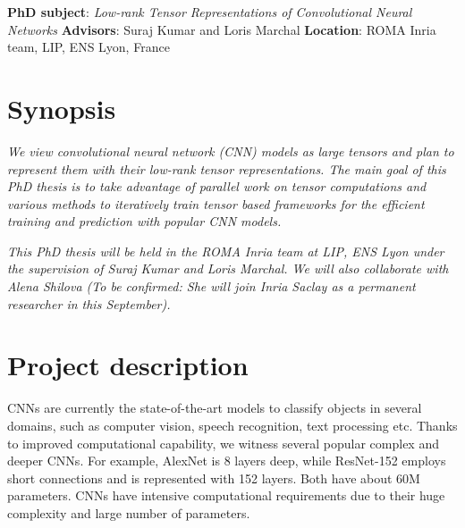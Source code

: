 \documentclass[11pt]{article}
\date{}
\begin{document}

 \noindent\textbf{PhD subject}: \emph{Low-rank Tensor Representations of Convolutional Neural Networks }\newline
 \textbf{Advisors}: Suraj Kumar and Loris Marchal\newline
 \textbf{Location}: ROMA Inria team, LIP, ENS Lyon, France

\section*{Synopsis}

\emph{We view convolutional neural network (CNN) models as large tensors and plan to represent them with their low-rank tensor representations. The main goal of this PhD thesis is to take advantage of parallel work on tensor computations and various methods to iteratively train tensor based frameworks for the efficient training and prediction with popular CNN models.}


\emph{This PhD thesis will be held in the ROMA Inria team at LIP, ENS Lyon under the supervision of Suraj Kumar and Loris Marchal. We will also collaborate with  Alena Shilova (To be confirmed: She will  join Inria Saclay as a permanent researcher in this September). }



\section{Project description}

CNNs are currently the state-of-the-art models to classify objects in several domains, such as computer vision, speech recognition, text processing etc. Thanks to improved computational capability, we witness several popular complex and deeper CNNs. For example, AlexNet is 8 layers deep, while ResNet-152 employs short connections and is represented with 152 layers. Both have about 60M parameters. CNNs have intensive computational requirements due to their huge complexity and large number of parameters. 
\end{document}
